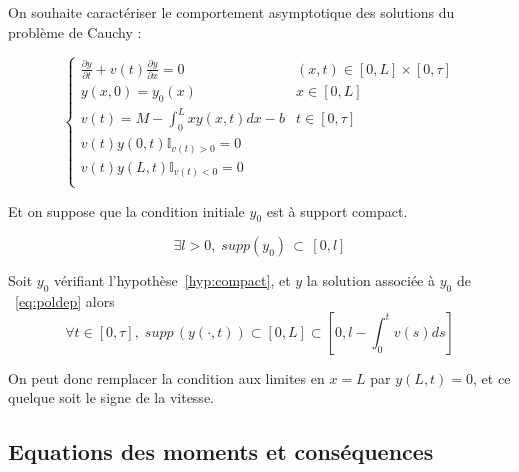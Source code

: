 \documentclass[a4paper]{article}
\newcommand{\dep}{b}
\begin{document}
On souhaite caractériser le comportement asymptotique des solutions du problème de Cauchy :

\begin{equation}
		\label{eq:poldep}
		\begin{cases}
			\displaystyle \frac{\partial y}{\partial t}+ v(t) \frac{\partial y} {\partial x}  = 0 & (x,t) \in [0,L] \times [0, \tau] \\
             y(x,0) = y_{0} (x) & x\in[0,L]\\
			 v(t) = M - \int_0^L x y(x,t)dx - \dep & t \in [0,\tau]\\
			 v(t)y(0,t)\mathbb{I}_{v(t) > 0} = 0 \\
			 v(t)y(L,t)\mathbb{I}_{v(t) < 0} = 0 \\
		\end{cases}
\end{equation}

Et on suppose que la condition initiale $y_0$ est à support compact.

\begin{equation}
	\label{hyp:compact}
	\exists l>0, \; supp(y_0) \, \subset \, [0,l]
\end{equation}

\begin{lemme}
	Soit $y_0$ vérifiant l'hypothèse~\eqref{hyp:compact},
	et $y$ la solution associée à $y_0$ de ~\eqref{eq:poldep} 
	alors 
 \[\forall t \in [0,\tau], \; supp \, (y(\cdot, t)) \subset [0,L]\subset [0,l-\int_{0}^t v(s)ds] \]
 \end{lemme}

On peut donc remplacer la condition aux limites en $x=L$ par $y(L,t)=0$, et ce quelque soit le signe de la vitesse.


\subsection{Equations des moments et conséquences}
\end{document}
